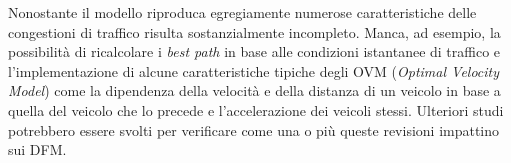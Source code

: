 \documentclass[../main.tex]{subfiles}
\begin{document}
Nonostante il modello riproduca egregiamente numerose caratteristiche delle congestioni di traffico risulta sostanzialmente incompleto.
Manca, ad esempio, la possibilit\`a di ricalcolare i \emph{best path} in base alle condizioni istantanee di traffico e l'implementazione di alcune caratteristiche tipiche degli OVM (\emph{Optimal Velocity Model}) come la dipendenza della velocit\`a e della distanza di un veicolo in base a quella del veicolo che lo precede e l'accelerazione dei veicoli stessi.
Ulteriori studi potrebbero essere svolti per verificare come una o pi\`u queste revisioni impattino sui DFM.
\end{document}
